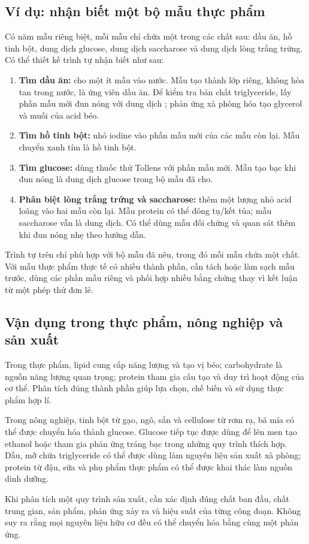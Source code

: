 \subsection{Ví dụ: nhận biết một bộ mẫu thực phẩm}

Có năm mẫu riêng biệt, mỗi mẫu chỉ chứa một trong các chất sau: dầu ăn, hồ tinh bột, dung dịch glucose, dung dịch saccharose và dung dịch lòng trắng trứng. Có thể thiết kế trình tự nhận biết như sau:

\begin{enumerate}
\item \textbf{Tìm dầu ăn:} cho một ít mẫu vào nước. Mẫu tạo thành lớp riêng, không hòa tan trong nước, là ứng viên dầu ăn. Để kiểm tra bản chất triglyceride, lấy phần mẫu mới đun nóng với dung dịch ; phản ứng xà phòng hóa tạo glycerol và muối của acid béo.
\item \textbf{Tìm hồ tinh bột:} nhỏ iodine vào phần mẫu mới của các mẫu còn lại. Mẫu chuyển xanh tím là hồ tinh bột.
\item \textbf{Tìm glucose:} dùng thuốc thử Tollens với phần mẫu mới. Mẫu tạo bạc khi đun nóng là dung dịch glucose trong bộ mẫu đã cho.
\item \textbf{Phân biệt lòng trắng trứng và saccharose:} thêm một lượng nhỏ acid loãng vào hai mẫu còn lại. Mẫu protein có thể đông tụ/kết tủa; mẫu saccharose vẫn là dung dịch. Có thể dùng mẫu đối chứng và quan sát thêm khi đun nóng nhẹ theo hướng dẫn.
\end{enumerate}

Trình tự trên chỉ phù hợp với bộ mẫu đã nêu, trong đó mỗi mẫu chứa một chất. Với mẫu thực phẩm thực tế có nhiều thành phần, cần tách hoặc làm sạch mẫu trước, dùng các phần mẫu riêng và phối hợp nhiều bằng chứng thay vì kết luận từ một phép thử đơn lẻ.

\subsection{Vận dụng trong thực phẩm, nông nghiệp và sản xuất}

Trong thực phẩm, lipid cung cấp năng lượng và tạo vị béo; carbohydrate là nguồn năng lượng quan trọng; protein tham gia cấu tạo và duy trì hoạt động của cơ thể. Phân tích đúng thành phần giúp lựa chọn, chế biến và sử dụng thực phẩm hợp lí.

Trong nông nghiệp, tinh bột từ gạo, ngô, sắn và cellulose từ rơm rạ, bã mía có thể được chuyển hóa thành glucose. Glucose tiếp tục được dùng để lên men tạo ethanol hoặc tham gia phản ứng tráng bạc trong những quy trình thích hợp. Dầu, mỡ chứa triglyceride có thể được dùng làm nguyên liệu sản xuất xà phòng; protein từ đậu, sữa và phụ phẩm thực phẩm có thể được khai thác làm nguồn dinh dưỡng.

Khi phân tích một quy trình sản xuất, cần xác định đúng chất ban đầu, chất trung gian, sản phẩm, phản ứng xảy ra và hiệu suất của từng công đoạn. Không suy ra rằng mọi nguyên liệu hữu cơ đều có thể chuyển hóa bằng cùng một phản ứng.
